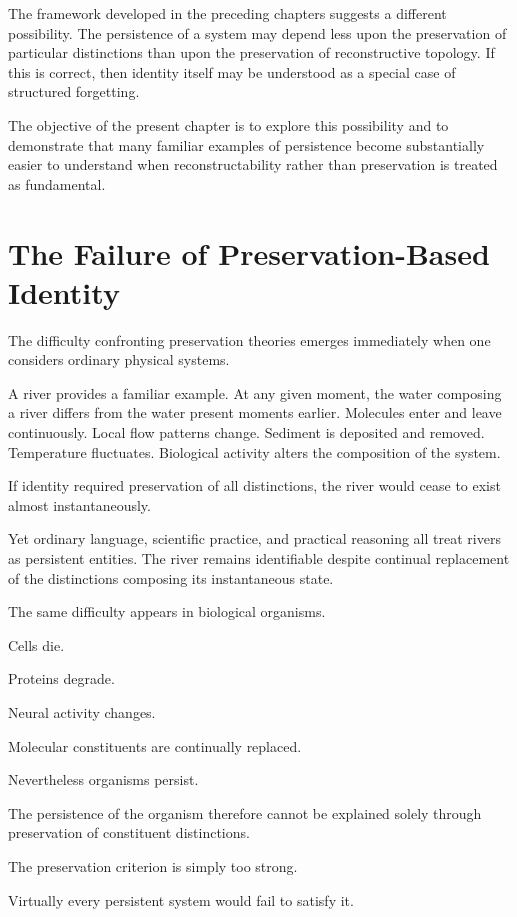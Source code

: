 \documentclass[12pt,oneside]{book}
\theoremstyle{plain} \newtheorem{theorem}{Theorem}[chapter] \newtheorem{lemma}[theorem]{Lemma} \newtheorem{proposition}[theorem]{Proposition} \newtheorem{corollary}[theorem]{Corollary}
\theoremstyle{definition} \newtheorem{definition}[theorem]{Definition} \newtheorem{axiom}[theorem]{Axiom} \newtheorem{construction}[theorem]{Construction}
\theoremstyle{remark} \newtheorem{remark}[theorem]{Remark} \newtheorem{example}[theorem]{Example}
\begin{document}
The framework developed in the preceding chapters suggests a different possibility. The persistence of a system may depend less upon the preservation of particular distinctions than upon the preservation of reconstructive topology. If this is correct, then identity itself may be understood as a special case of structured forgetting.

The objective of the present chapter is to explore this possibility and to demonstrate that many familiar examples of persistence become substantially easier to understand when reconstructability rather than preservation is treated as fundamental.

\section{The Failure of Preservation-Based Identity}

The difficulty confronting preservation theories emerges immediately when one considers ordinary physical systems.

A river provides a familiar example. At any given moment, the water composing a river differs from the water present moments earlier. Molecules enter and leave continuously. Local flow patterns change. Sediment is deposited and removed. Temperature fluctuates. Biological activity alters the composition of the system.

If identity required preservation of all distinctions, the river would cease to exist almost instantaneously.

Yet ordinary language, scientific practice, and practical reasoning all treat rivers as persistent entities. The river remains identifiable despite continual replacement of the distinctions composing its instantaneous state.

The same difficulty appears in biological organisms.

Cells die.

Proteins degrade.

Neural activity changes.

Molecular constituents are continually replaced.

Nevertheless organisms persist.

The persistence of the organism therefore cannot be explained solely through preservation of constituent distinctions.

The preservation criterion is simply too strong.

Virtually every persistent system would fail to satisfy it.
\end{document}
